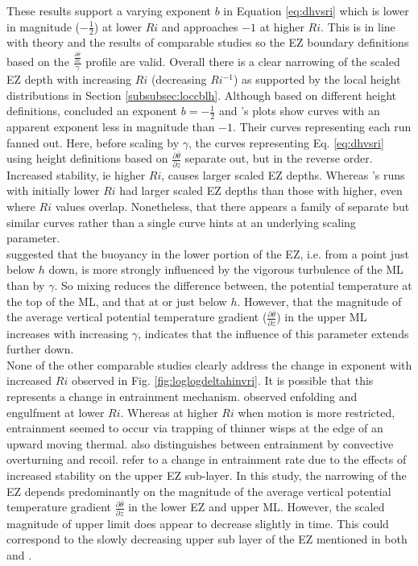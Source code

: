 These results support a varying exponent $b$ in Equation \ref{eq:dhvsri} which is lower in magnitude ($-\frac{1}{2}$) at lower $Ri$ and approaches $-1$ at higher $Ri$.  This is in line with theory and the results of comparable studies so the EZ boundary definitions based on the $\frac{\frac{\partial \overline{\theta}}{\partial z}}{\gamma}$ profile are valid.  Overall there is a clear narrowing of the scaled EZ depth with increasing $Ri$ (decreasing $Ri^{-1}$) as supported by the local height distributions in Section \ref{subsubsec:loccblh}.  Although based on different height definitions, \cite{FedConzMir04} concluded an exponent $b = -\frac{1}{2}$ and \cite{BrooksFowler2}'s plots show curves with an apparent exponent less in magnitude than $-1$.  Their curves representing each run fanned out.  Here, before scaling by $\gamma$, the curves representing Eq. \ref{eq:dhvsri} using height definitions based on $\frac{\partial \overline{\theta}}{\partial z}$ separate out, but in the reverse order.  Increased stability, ie higher $Ri$, causes larger scaled EZ depths.  Whereas \cite{BrooksFowler2}'s runs with initially lower $Ri$ had larger scaled EZ depths than those with higher, even where $Ri$ values overlap. Nonetheless, that there appears a family of separate but similar curves rather than a single curve hints at an underlying scaling parameter.\\     

\cite{GarciaMellado} suggested that the buoyancy in the lower portion of the EZ, i.e. from a point just below $h$ down, is more strongly influenced by the vigorous turbulence of the ML than by $\gamma$.  So mixing reduces the difference between, the potential temperature at the top of the ML, and that at or just below $h$.  However, that the magnitude of the average vertical potential temperature gradient ($\frac{\partial \overline{\theta}}{\partial z}$) in the upper ML increases with increasing $\gamma$, indicates that the influence of this parameter extends further down.\\

None of the other comparable studies clearly address the change in exponent with increased $Ri$ observed in Fig. \ref{fig:loglogdeltahinvri}.  It is possible that this represents a change in entrainment mechanism. \cite{SullMoengStev} observed enfolding and engulfment at lower $Ri$.  Whereas at higher $Ri$ when motion is more restricted, entrainment seemed to occur via trapping of thinner wisps at the edge of an upward moving thermal.  \cite{Turner86} also distinguishes between entrainment by convective overturning and recoil. \cite{GarciaMellado} refer to a change in entrainment rate due to the effects of increased stability on the upper EZ sub-layer.  In this study, the narrowing of the EZ depends predominantly on the magnitude of the average vertical potential temperature gradient $\frac{\partial \overline{\theta}}{\partial z}$ in the lower EZ and upper ML.  However, the scaled magnitude of upper limit does appear to decrease slightly in time.  This could correspond to the slowly decreasing upper sub layer of the EZ mentioned in both \cite{GarciaMellado} and \cite{FedConzMir04}.\\

